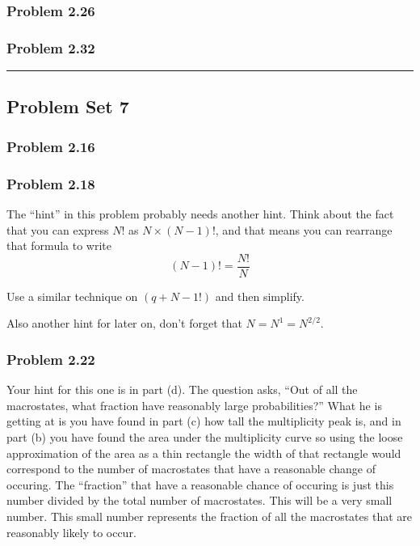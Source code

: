 \documentclass[11pt]{article}
\begin{document}
\subsubsection{Problem 2.26}\label{problem-2.26}

\subsubsection{Problem 2.32}\label{problem-2.32}

\begin{center}\rule{0.5\linewidth}{0.5pt}\end{center}

    \subsection{Problem Set 7}\label{problem-set-7}

\subsubsection{Problem 2.16}\label{problem-2.16}

\subsubsection{Problem 2.18}\label{problem-2.18}

The ``hint'' in this problem probably needs another hint. Think about
the fact that you can express \(N!\) as \(N\times (N-1)!\), and that
means you can rearrange that formula to write
\[ (N-1)! = \frac{N!}{N} \]

Use a similar technique on \((q+N-1!)\) and then simplify.

Also another hint for later on, don't forget that \(N = N^1 = N^{2/2}\).

\subsubsection{Problem 2.22}\label{problem-2.22}

Your hint for this one is in part (d). The question asks, ``Out of all
the macrostates, what fraction have reasonably large probabilities?''
What he is getting at is you have found in part (c) how tall the
multiplicity peak is, and in part (b) you have found the area under the
multiplicity curve so using the loose approximation of the area as a
thin rectangle the width of that rectangle would correspond to the
number of macrostates that have a reasonable change of occuring. The
``fraction'' that have a reasonable chance of occuring is just this
number divided by the total number of macrostates. This will be a very
small number. This small number represents the fraction of all the
macrostates that are reasonably likely to occur.
\end{document}
